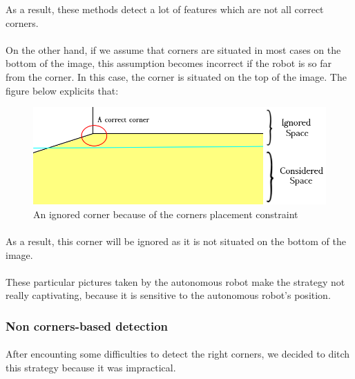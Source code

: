 \documentclass[12pt]{report}
\begin{document}
	 As a result, these methods detect a lot of features which are not all correct corners.
	 
	 \paragraph{}
	 On the other hand, if we assume that corners are situated in most cases on the bottom of the image, this assumption becomes incorrect if the robot is so far from the corner. In this case, the corner is situated on the top of the image. The figure below explicits that:
	 	\begin{figure}[H]
	 	\begin{center}
	 		\includegraphics[scale=0.6]{res/start1_c1.png}
	 		\caption{An ignored corner because of the corners placement constraint}
	 	\end{center}
	 \end{figure}
	 \paragraph{}
	 As a result, this corner will be ignored as it is not situated on the bottom of the image.
	 
	 \paragraph{}
	 These particular pictures taken by the autonomous robot make the strategy not really captivating, because it is sensitive to the autonomous robot's position.
	 
	 \subsubsection{Non corners-based detection}
	 \paragraph{}
	 After encounting some difficulties to detect the right corners, we decided to ditch this strategy because it was impractical. 
	 
\end{document}
